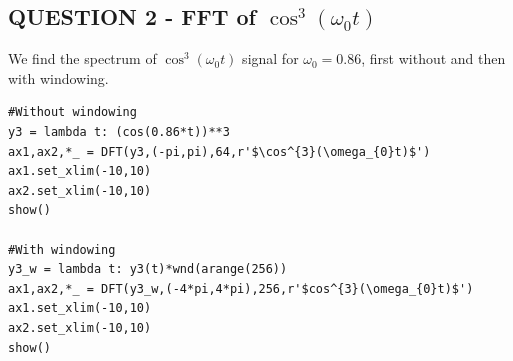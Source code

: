 \documentclass[11pt, a4paper]{article}
\begin{document}
\subsection{QUESTION 2 - FFT of $\cos^3(\omega_{0} t)$} 
{
We find the spectrum of $\cos^3(\omega_{0} t)$ signal for $\omega_{0} = 0.86$, first without and then with windowing.
}
\begin{verbatim}
#Without windowing
y3 = lambda t: (cos(0.86*t))**3
ax1,ax2,*_ = DFT(y3,(-pi,pi),64,r'$\cos^{3}(\omega_{0}t)$')
ax1.set_xlim(-10,10)
ax2.set_xlim(-10,10)
show()

#With windowing
y3_w = lambda t: y3(t)*wnd(arange(256))
ax1,ax2,*_ = DFT(y3_w,(-4*pi,4*pi),256,r'$cos^{3}(\omega_{0}t)$')
ax1.set_xlim(-10,10)
ax2.set_xlim(-10,10)
show()
\end{verbatim}
\end{document}
